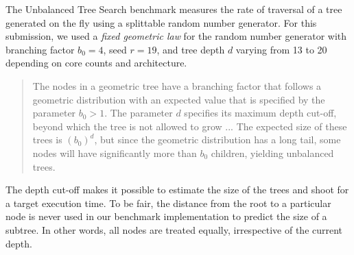 The Unbalanced Tree Search benchmark measures the rate of traversal of
a tree generated on the fly using a splittable random number
generator. For this submission, we used a \emph{fixed geometric law}
for the random number generator with branching factor $b_0=4$, seed
$r=19$, and tree depth $d$ varying from 13 to 20 depending on core counts and architecture.

\begin{quote}
The nodes in a geometric tree have a branching factor that follows a
geometric distribution with an expected value that is specified by the  
parameter $b_0 > 1$. The parameter $d$ specifies its maximum depth
cut-off, beyond which the tree is not allowed to grow ... The expected
size of these trees is $(b_0)^d$, but since the geometric distribution
has a long tail, some nodes will have significantly more than $b_0$
children, yielding unbalanced trees. 
\end{quote}

The depth cut-off makes it possible to estimate the size of the trees
and shoot for a target execution time. To be fair, the distance from
the root to a particular node is never used in our benchmark
implementation to predict the size of a subtree. In other words, all
nodes are treated equally, irrespective of the current depth.  




